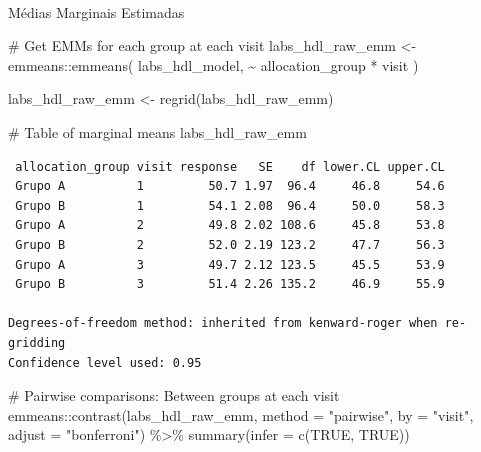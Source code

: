 \documentclass[
  letterpaper,
  DIV=11,
  numbers=noendperiod]{scrartcl}
\makeatletter
\let\oldparagraph\paragraph
\renewcommand{\paragraph}{
    \@ifstar
      \xxxParagraphStar
      \xxxParagraphNoStar
  }
\newcommand{\xxxParagraphStar}[1]{\oldparagraph*{#1}\mbox{}}
\newcommand{\xxxParagraphNoStar}[1]{\oldparagraph{#1}\mbox{}}
\newenvironment{Shaded}{\begin{snugshade}}{\end{snugshade}}
\newcommand{\AttributeTok}[1]{\textcolor[rgb]{0.40,0.45,0.13}{#1}}
\newcommand{\CommentTok}[1]{\textcolor[rgb]{0.37,0.37,0.37}{#1}}
\newcommand{\ConstantTok}[1]{\textcolor[rgb]{0.56,0.35,0.01}{#1}}
\newcommand{\FunctionTok}[1]{\textcolor[rgb]{0.28,0.35,0.67}{#1}}
\newcommand{\NormalTok}[1]{\textcolor[rgb]{0.00,0.23,0.31}{#1}}
\newcommand{\OtherTok}[1]{\textcolor[rgb]{0.00,0.23,0.31}{#1}}
\newcommand{\SpecialCharTok}[1]{\textcolor[rgb]{0.37,0.37,0.37}{#1}}
\newcommand{\StringTok}[1]{\textcolor[rgb]{0.13,0.47,0.30}{#1}}
\makeatother
\begin{document}
\paragraph{Médias Marginais
Estimadas}\label{muxe9dias-marginais-estimadas-6}

\begin{Shaded}
\begin{Highlighting}[]
\CommentTok{\# Get EMMs for each group at each visit}
\NormalTok{labs\_hdl\_raw\_emm }\OtherTok{\textless{}{-}}\NormalTok{ emmeans}\SpecialCharTok{::}\FunctionTok{emmeans}\NormalTok{(}
\NormalTok{    labs\_hdl\_model, }
    \SpecialCharTok{\textasciitilde{}}\NormalTok{ allocation\_group }\SpecialCharTok{*}\NormalTok{ visit}
\NormalTok{)}

\NormalTok{labs\_hdl\_raw\_emm }\OtherTok{\textless{}{-}} \FunctionTok{regrid}\NormalTok{(labs\_hdl\_raw\_emm)}

\CommentTok{\# Table of marginal means}
\NormalTok{labs\_hdl\_raw\_emm}
\end{Highlighting}
\end{Shaded}

\begin{verbatim}
 allocation_group visit response   SE    df lower.CL upper.CL
 Grupo A          1         50.7 1.97  96.4     46.8     54.6
 Grupo B          1         54.1 2.08  96.4     50.0     58.3
 Grupo A          2         49.8 2.02 108.6     45.8     53.8
 Grupo B          2         52.0 2.19 123.2     47.7     56.3
 Grupo A          3         49.7 2.12 123.5     45.5     53.9
 Grupo B          3         51.4 2.26 135.2     46.9     55.9

Degrees-of-freedom method: inherited from kenward-roger when re-gridding 
Confidence level used: 0.95 
\end{verbatim}

\begin{Shaded}
\begin{Highlighting}[]
\CommentTok{\# Pairwise comparisons: Between groups at each visit}
\NormalTok{emmeans}\SpecialCharTok{::}\FunctionTok{contrast}\NormalTok{(labs\_hdl\_raw\_emm, }\AttributeTok{method =} \StringTok{"pairwise"}\NormalTok{, }\AttributeTok{by =} \StringTok{"visit"}\NormalTok{, }\AttributeTok{adjust =} \StringTok{"bonferroni"}\NormalTok{) }\SpecialCharTok{\%\textgreater{}\%} \FunctionTok{summary}\NormalTok{(}\AttributeTok{infer =} \FunctionTok{c}\NormalTok{(}\ConstantTok{TRUE}\NormalTok{, }\ConstantTok{TRUE}\NormalTok{))}
\end{Highlighting}
\end{Shaded}
\end{document}
